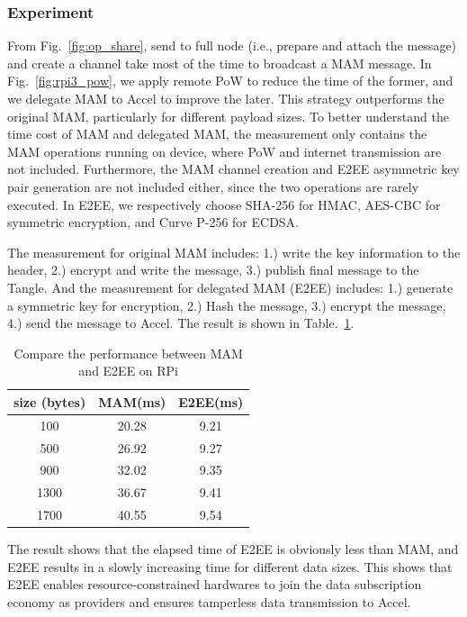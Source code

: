 \documentclass[10pt, conference, compsocconf]{IEEEtran}
\begin{document}
\subsubsection{Experiment}
From Fig.~\ref{fig:op_share}, send to full node (i.e., prepare and attach the message) and create a channel take most of the time to broadcast a MAM message. In Fig.~\ref{fig:rpi3_pow}, we apply remote PoW to reduce the time of the former, and we delegate MAM to Accel to improve the later. This strategy outperforms the original MAM, particularly for different payload sizes. To better understand the time cost of MAM and delegated MAM, the measurement only contains the MAM operations running on device, where PoW and internet transmission are not included. Furthermore, the MAM channel creation and E2EE asymmetric key pair generation are not included either, since the two operations are rarely executed. In E2EE, we respectively choose SHA-256 for HMAC, AES-CBC for symmetric encryption, and Curve P-256 for ECDSA.

The measurement for original MAM includes: 1.) write the key information to the header, 2.) encrypt and write the message, 3.) publish final message to the Tangle. And the measurement for delegated MAM (E2EE) includes: 1.) generate a symmetric key for encryption, 2.) Hash the message, 3.) encrypt the message, 4.) send the message to Accel. The result is shown in Table.~\ref{tab:mam_vs_e2ee}.

\begin{table}[htbp]
    \caption{Compare the performance between MAM and E2EE on RPi}
    \label{tab:mam_vs_e2ee}
    \centering
        \begin{tabular}{|c||c|c|}
        \hline
            \textbf{size (bytes)} & \textbf{MAM(ms)} & \textbf{E2EE(ms)} \\
            \hline
            100 & 20.28 & 9.21 \\
            500 &  26.92 & 9.27 \\
            900 & 32.02 &  9.35  \\
            1300 & 36.67 & 9.41 \\
            1700 & 40.55 & 9.54 \\
            \hline
        \end{tabular}
\end{table}

The result shows that the elapsed time of E2EE is obviously less than MAM, and E2EE results in a slowly increasing time for different data sizes. This shows that E2EE enables resource-constrained hardwares to join the data subscription economy as providers and ensures tamperless data transmission to Accel.
\end{document}
